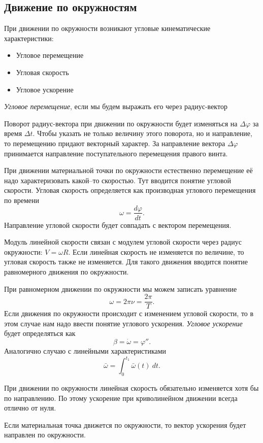 \subsection{Движение по окружностям}

При движении по окружности возникают угловые кинематические характеристики:
\begin{itemize}
	\item Угловое перемещение
	\item Угловая скорость
	\item Угловое ускорение
\end{itemize}

\emph{Угловое перемещение}, если мы будем выражать его через радиус-вектор

Поворот радиус-вектора при движении по окружности будет изменяться на \( \Delta
\varphi \) за время \( \Delta t \). Чтобы указать не только величину этого
поворота, но и направление, то перемещению придают векторный характер. За
направление вектора \( \Delta \varphi \) принимается направление
поступательного перемещения правого винта.

При движении материальной точки по окружности естественно перемещение её надо
характеризовать какой--то скоростью. Тут вводится понятие угловой скорости.
Угловая скорость определяется как производная углового перемещения по времени
\[ \omega = \frac{d \varphi}{d t} .\] Направление угловой скорости будет
совпадать с вектором перемещения.

Модуль линейной скорости связан с модулем угловой скорости через радиус
окружности: \( V = \omega R \). Если линейная скорость не изменяется
по величине, то
угловая скорость также не изменяется. Для такого движения вводится понятие
равномерного движения по окружности.

При равномерном движении по окружности мы можем записать уравнение \[
	\omega = 2 \pi \nu = \frac{2 \pi}{T}
	.\] Если движения по окружности происходит с изменением угловой скорости, то
в этом случае нам надо ввести понятие углового ускорения. \emph{Угловое
	ускорение} будет определяться как \[
	\beta = \dot{\omega} = \varphi''
	.\] Аналогично случаю с линейными характеристиками \[
	\bar{\omega} = \int_{{0}}^{{t_1}} {\bar{\omega} (t)} \: d{t} {}
	.\]

При движении по окружности линейная скорость обязательно изменяется хотя бы по
направлению. По этому ускорение при криволинейном движении всегда отлично от
нуля.

Если материальная точка движется по окружности, то вектор ускорения будет
направлен по окружности.

